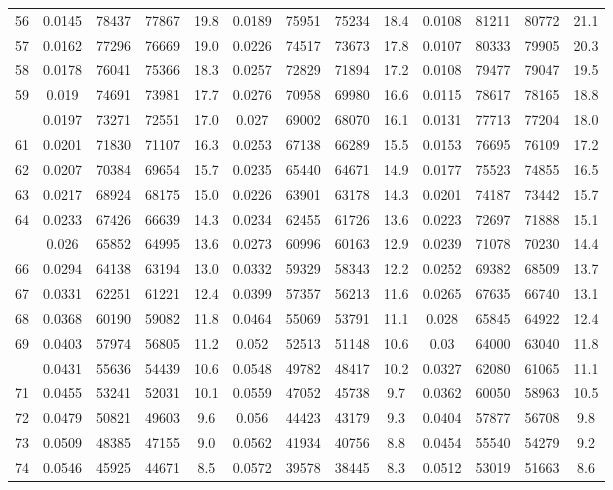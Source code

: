 \documentclass[
  14pt,
]{article}
\begin{document}
\begin{longtable}[t]{lcccccccccccc}
56 & 0.0145 & 78437 & 77867 & 19.8 & 0.0189 & 75951 & 75234 & 18.4 & 0.0108 & 81211 & 80772 & 21.1\\
57 & 0.0162 & 77296 & 76669 & 19.0 & 0.0226 & 74517 & 73673 & 17.8 & 0.0107 & 80333 & 79905 & 20.3\\
58 & 0.0178 & 76041 & 75366 & 18.3 & 0.0257 & 72829 & 71894 & 17.2 & 0.0108 & 79477 & 79047 & 19.5\\
59 & 0.019 & 74691 & 73981 & 17.7 & 0.0276 & 70958 & 69980 & 16.6 & 0.0115 & 78617 & 78165 & 18.8\\
\addlinespace
60 & 0.0197 & 73271 & 72551 & 17.0 & 0.027 & 69002 & 68070 & 16.1 & 0.0131 & 77713 & 77204 & 18.0\\
61 & 0.0201 & 71830 & 71107 & 16.3 & 0.0253 & 67138 & 66289 & 15.5 & 0.0153 & 76695 & 76109 & 17.2\\
62 & 0.0207 & 70384 & 69654 & 15.7 & 0.0235 & 65440 & 64671 & 14.9 & 0.0177 & 75523 & 74855 & 16.5\\
63 & 0.0217 & 68924 & 68175 & 15.0 & 0.0226 & 63901 & 63178 & 14.3 & 0.0201 & 74187 & 73442 & 15.7\\
64 & 0.0233 & 67426 & 66639 & 14.3 & 0.0234 & 62455 & 61726 & 13.6 & 0.0223 & 72697 & 71888 & 15.1\\
\addlinespace
65 & 0.026 & 65852 & 64995 & 13.6 & 0.0273 & 60996 & 60163 & 12.9 & 0.0239 & 71078 & 70230 & 14.4\\
66 & 0.0294 & 64138 & 63194 & 13.0 & 0.0332 & 59329 & 58343 & 12.2 & 0.0252 & 69382 & 68509 & 13.7\\
67 & 0.0331 & 62251 & 61221 & 12.4 & 0.0399 & 57357 & 56213 & 11.6 & 0.0265 & 67635 & 66740 & 13.1\\
68 & 0.0368 & 60190 & 59082 & 11.8 & 0.0464 & 55069 & 53791 & 11.1 & 0.028 & 65845 & 64922 & 12.4\\
69 & 0.0403 & 57974 & 56805 & 11.2 & 0.052 & 52513 & 51148 & 10.6 & 0.03 & 64000 & 63040 & 11.8\\
\addlinespace
70 & 0.0431 & 55636 & 54439 & 10.6 & 0.0548 & 49782 & 48417 & 10.2 & 0.0327 & 62080 & 61065 & 11.1\\
71 & 0.0455 & 53241 & 52031 & 10.1 & 0.0559 & 47052 & 45738 & 9.7 & 0.0362 & 60050 & 58963 & 10.5\\
72 & 0.0479 & 50821 & 49603 & 9.6 & 0.056 & 44423 & 43179 & 9.3 & 0.0404 & 57877 & 56708 & 9.8\\
73 & 0.0509 & 48385 & 47155 & 9.0 & 0.0562 & 41934 & 40756 & 8.8 & 0.0454 & 55540 & 54279 & 9.2\\
74 & 0.0546 & 45925 & 44671 & 8.5 & 0.0572 & 39578 & 38445 & 8.3 & 0.0512 & 53019 & 51663 & 8.6\\

\end{longtable}
\end{document}
